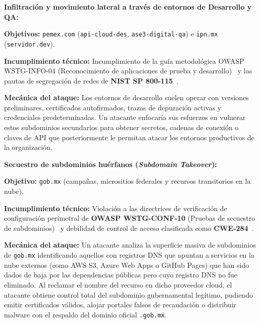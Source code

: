 \begin{enumerateColor}
    \item \textbf{Infiltración y movimiento lateral a través de entornos de Desarrollo y QA:}
    \begin{itemizeColor}
        \item \textbf{Objetivos:} \texttt{pemex.com} (\texttt{api-cloud-des}, \texttt{ase3-digital-qa}) e \texttt{ipn.mx} (\texttt{servidor.dev}).
        \item \textbf{Incumplimiento técnico:} Incumplimiento de la guía metodológica OWASP WSTG-INFO-04 (Reconocimiento de aplicaciones de prueba y desarrollo)~\cite{owasp_wstg} y las pautas de segregación de redes de \textbf{NIST SP 800-115}~\cite{nist_sp800_115}.
        \item \textbf{Mecánica del ataque:} Los entornos de desarrollo suelen operar con versiones preliminares, certificados autofirmados, trazas de depuración activas y credenciales predeterminadas. Un atacante enfocaría sus esfuerzos en vulnerar estos subdominios secundarios para obtener secretos, cadenas de conexión o claves de API que posteriormente le permitan atacar los entornos productivos de la organización.
    \end{itemizeColor}

    \item \textbf{Secuestro de subdominios huérfanos (\textit{Subdomain Takeover}):}
    \begin{itemizeColor}
        \item \textbf{Objetivo:} \texttt{gob.mx} (campañas, micrositios federales y recursos transitorios en la nube).
        \item \textbf{Incumplimiento técnico:} Violación a las directrices de verificación de configuración perimetral de \textbf{OWASP WSTG-CONF-10} (Pruebas de secuestro de subdominios)~\cite{owasp_wstg} y debilidad de control de acceso clasificada como \textbf{CWE-284}~\cite{cwe_284}.
        \item \textbf{Mecánica del ataque:} Un atacante analiza la superficie masiva de subdominios de \texttt{gob.mx} identificando aquellos con registros DNS que apuntan a servicios en la nube externos (como AWS S3, Azure Web Apps o GitHub Pages) que han sido dados de baja por las dependencias públicas pero cuyo registro DNS no fue eliminado. Al reclamar el nombre del recurso en dicho proveedor cloud, el atacante obtiene control total del subdominio gubernamental legítimo, pudiendo emitir certificados válidos, alojar portales falsos de recaudación o distribuir malware con el respaldo del dominio oficial \texttt{.gob.mx}.
    \end{itemizeColor}


\end{enumerateColor}
